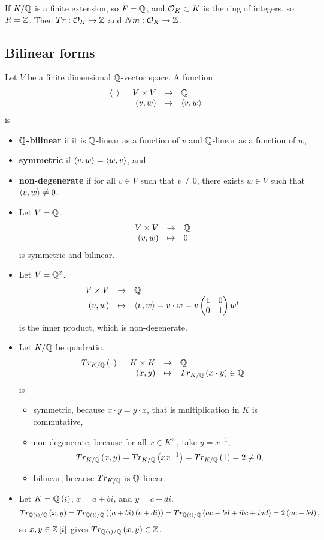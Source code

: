 \begin{corollary}
If $ K / \mathbb{Q} $ is a finite extension, so $ F = \mathbb{Q} $, and $ \mathcal{O}_K \subset K $ is the ring of integers, so $ R = \mathbb{Z} $. Then $ Tr : \mathcal{O}_K \to \mathbb{Z} $ and $ Nm : \mathcal{O}_K \to \mathbb{Z} $.
\end{corollary}

\pagebreak

\subsection{Bilinear forms}

\begin{definition}
Let $ V $ be a finite dimensional $ \mathbb{Q} $-vector space. A function
$$ \function[\ab{,}]{V \times V}{\Q}{\rb{v, w}}{\ab{v, w}} $$
is
\begin{itemize}
\item \textbf{$ \mathbb{Q} $-bilinear} if it is $ \mathbb{Q} $-linear as a function of $ v $ and $ \mathbb{Q} $-linear as a function of $ w $,
\item \textbf{symmetric} if $ \left\langle v, w \right\rangle = \left\langle w, v \right\rangle $, and
\item \textbf{non-degenerate} if for all $ v \in V $ such that $ v \ne 0 $, there exists $ w \in V $ such that $ \left\langle v, w \right\rangle \ne 0 $.
\end{itemize}
\end{definition}

\begin{example*}
\hfill
\begin{itemize}
\item Let $ V = \mathbb{Q} $.
$$ \function{V \times V}{\Q}{\rb{v, w}}{0} $$
is symmetric and bilinear.
\item Let $ V = \mathbb{Q}^2 $.
$$ \function{V \times V}{\Q}{\rb{v, w}}{\ab{v, w} = v \cdot w = v\twobytwo{1}{0}{0}{1}w^t} $$
is the inner product, which is non-degenerate.
\item Let $ K / \mathbb{Q} $ be quadratic.
$$ \function[Tr_{K / \Q}\rb{,}]{K \times K}{\Q}{\rb{x, y}}{Tr_{K / \Q}\rb{x \cdot y} \in \Q} $$
is
\begin{itemize}
\item symmetric, because $ x \cdot y = y \cdot x $, that is multiplication in $ K $ is commutative,
\item non-degenerate, because for all $ x \in K^\times $, take $ y = x^{-1} $,
$$ Tr_{K / \mathbb{Q}}\left( x, y \right) = Tr_{K / \mathbb{Q}}\left( xx^{-1} \right) = Tr_{K / \mathbb{Q}}\left( 1 \right) = 2 \ne 0, $$
\item bilinear, because $ Tr_{K / \mathbb{Q}} $ is $ \mathbb{Q} $-linear.
\end{itemize}
\item Let $ K = \mathbb{Q}\left( i \right) $, $ x = a + bi $, and $ y = c + di $.
$$ Tr_{\mathbb{Q}\left( i \right) / \mathbb{Q}}\left( x, y \right) = Tr_{\mathbb{Q}\left( i \right) / \mathbb{Q}}\left( \left( a + bi \right)\left( c + di \right) \right) = Tr_{\mathbb{Q}\left( i \right) / \mathbb{Q}}\left( ac - bd + ibc + iad \right) = 2\left( ac - bd \right), $$
so $ x, y \in \mathbb{Z}\left[ i \right] $ gives $ Tr_{\mathbb{Q}\left( i \right) / \mathbb{Q}}\left( x, y \right) \in \mathbb{Z} $.
\end{itemize}
\end{example*}

